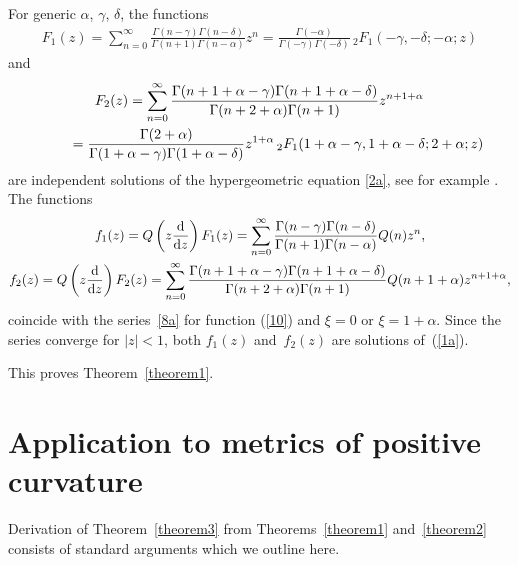 \documentclass[pdftex]{sigma}
\numberwithin{equation}{section}
\begin{document}
For generic $\alpha$, $\gamma$, $\delta$, the functions
\begin{gather*}
F_1(z) = \sum_{n=0}^\infty \frac{\Gamma(n-\gamma) \Gamma(n-\delta)}{\Gamma(n+1) \Gamma(n-\alpha)} z^n = \frac{\Gamma(-\alpha)}{\Gamma(-\gamma) \Gamma(-\delta)} \,{}_2F_1(-\gamma,-\delta;-\alpha;z)
\end{gather*}
and
\begin{gather*}
F_2(z)= \sum_{n=0}^\infty
\frac{\Gamma(n+1+\alpha-\gamma) \Gamma(n+1+\alpha-\delta)} {\Gamma(n+2+\alpha) \Gamma(n+1)} z^{n+1+\alpha}\\
\hphantom{F_2(z)}{} = \frac{\Gamma(2+\alpha)} {\Gamma(1+\alpha-\gamma) \Gamma(1+\alpha-\delta)} z^{1+\alpha} \, {}_2F_1(1+\alpha-\gamma,1+\alpha-\delta;2+\alpha;z)
\end{gather*}
are independent solutions of the hypergeometric equation \eqref{2a}, see for example \cite{Mellin}. The functions
\begin{gather*}
f_1(z) = Q\left({z\frac{{\rm d}}{{\rm d}z}}\right) F_1(z) = \sum_{n=0}^\infty \frac{\Gamma(n-\gamma) \Gamma(n-\delta)}{\Gamma(n+1) \Gamma(n-\alpha)} Q(n) z^n,\\
f_2(z) = Q\left({z\frac{{\rm d}}{{\rm d}z}}\right) F_2(z) = \sum_{n=0}^\infty\frac{\Gamma(n+1+\alpha-\gamma) \Gamma(n+1+\alpha-\delta)}{\Gamma(n+2+\alpha) \Gamma(n+1)} Q(n+1+\alpha) z^{n+1+\alpha},
\end{gather*}
coincide with the series~\eqref{8a} for function (\ref{10}) and $\xi=0$ or $\xi=1+\alpha$. Since the series converge for $|z|<1$, both $f_1(z)$ and~$f_2(z)$ are solutions of~(\ref{1a}).

This proves Theorem~\ref{theorem1}.

\section{Application to metrics of positive curvature}\label{section6}

Derivation of Theorem~\ref{theorem3} from Theorems~\ref{theorem1} and~\ref{theorem2} consists of standard arguments which we outline here.
\end{document}

